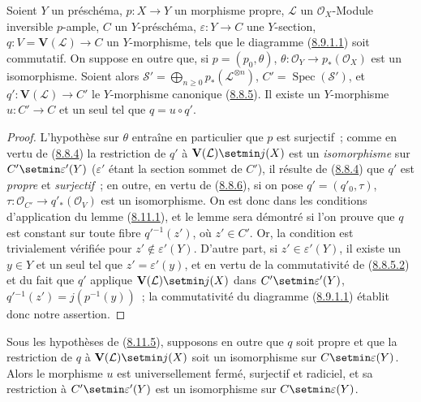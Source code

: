 \begin{lemma}[8.11.5]
\label{II.8.11.5-fr}
Soient $Y$ un préschéma, $p:X\to Y$ un morphisme propre, $\mathcal{L}$ un
$\mathcal{O}_X$-Module inversible $p$-ample, $C$ un $Y$-préschéma,
$\varepsilon:Y\to C$ une $Y$-section,
$q:V=\mathbf{V}(\mathcal{L})\to C$ un $Y$-morphisme, tels que le diagramme
\textup{(\hyperref[II.8.9.1.1-fr]{8.9.1.1})} soit commutatif. On suppose en outre que,
si $p=(p_0,\theta)$,
$\theta:\mathcal{O}_Y\to p_*(\mathcal{O}_X)$ est un isomorphisme. Soient alors
$\mathcal{S}'=\bigoplus_{n\geqslant0}p_*(\mathcal{L}^{\otimes n})$,
$C'=\operatorname{Spec}(\mathcal{S}')$, et
$q':\mathbf{V}(\mathcal{L})\to C'$ le $Y$-morphisme canonique
\textup{(\hyperref[II.8.8.5-fr]{8.8.5})}. Il existe un $Y$-morphisme $u:C'\to C$ et
un seul tel que $q=u\circ q'$.
\end{lemma}

\begin{proof}
L'hypothèse sur $\theta$ entraîne en particulier que $p$ est surjectif~;
comme en vertu de (\hyperref[II.8.8.4-fr]{8.8.4}) la restriction de $q'$ à
$\mathbf{V}(\mathcal{L})\setmin j(X)$ est un \emph{isomorphisme} sur
$C'\setmin\varepsilon'(Y)$ ($\varepsilon'$ étant la section sommet de $C'$), il
résulte de (\hyperref[II.8.8.4-fr]{8.8.4}) que $q'$ est \emph{propre} et
\emph{surjectif}~; en outre, en vertu de (\hyperref[II.8.8.6-fr]{8.8.6}), si on pose
$q'=(q'_0,\tau)$,
$\tau:\mathcal{O}_{C'}\to q'_*(\mathcal{O}_V)$ est un isomorphisme. On est
donc dans les conditions d'application du lemme
(\hyperref[II.8.11.1-fr]{8.11.1}), et le lemme sera démontré si l'on prouve
que $q$ est constant sur toute fibre $q'{}^{-1}(z')$, où $z'\in C'$. Or, la
condition est trivialement vérifiée pour $z'\notin\varepsilon'(Y)$. D'autre
part, si $z'\in\varepsilon'(Y)$, il existe un $y\in Y$ et un seul tel que
$z'=\varepsilon'(y)$, et en vertu de la commutativité de
(\hyperref[II.8.8.5.2-fr]{8.8.5.2}) et du fait que $q'$ applique
$\mathbf{V}(\mathcal{L})\setmin j(X)$ dans $C'\setmin\varepsilon'(Y)$,
$q'{}^{-1}(z')=j(p^{-1}(y))$~; la commutativité du diagramme
(\hyperref[II.8.9.1.1-fr]{8.9.1.1}) établit donc notre assertion.
\end{proof}

\begin{corollary}[8.11.6]
\label{II.8.11.6-fr}
Sous les hypothèses de \textup{(\hyperref[II.8.11.5-fr]{8.11.5})}, supposons en outre que
$q$ soit propre et que la restriction de $q$ à
$\mathbf{V}(\mathcal{L})\setmin j(X)$ soit un isomorphisme sur
$C\setmin\varepsilon(Y)$. Alors le morphisme $u$ est universellement fermé,
surjectif et radiciel, et sa restriction à $C'\setmin\varepsilon'(Y)$ est un
isomorphisme sur $C\setmin\varepsilon(Y)$.
\end{corollary}

